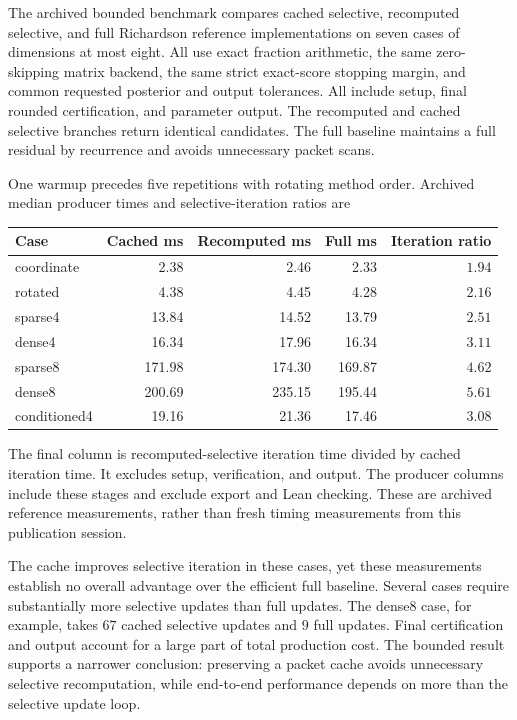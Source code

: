The archived bounded benchmark compares cached selective, recomputed selective,
and full Richardson reference implementations on seven cases of dimensions at
most eight. All use exact fraction arithmetic, the same zero-skipping matrix
backend, the same strict exact-score stopping margin, and common requested
posterior and output tolerances. All include setup, final rounded certification,
and parameter output. The recomputed and cached selective branches return
identical candidates. The full baseline maintains a full residual by recurrence
and avoids unnecessary packet scans.

One warmup precedes five repetitions with rotating method order. Archived median
producer times and selective-iteration ratios are
\begin{center}
\begin{tabular}{lrrrr}
\toprule
Case & Cached ms & Recomputed ms & Full ms & Iteration ratio\\
\midrule
coordinate & 2.38 & 2.46 & 2.33 & $1.94$\\
rotated & 4.38 & 4.45 & 4.28 & $2.16$\\
sparse4 & 13.84 & 14.52 & 13.79 & $2.51$\\
dense4 & 16.34 & 17.96 & 16.34 & $3.11$\\
sparse8 & 171.98 & 174.30 & 169.87 & $4.62$\\
dense8 & 200.69 & 235.15 & 195.44 & $5.61$\\
conditioned4 & 19.16 & 21.36 & 17.46 & $3.08$\\
\bottomrule
\end{tabular}
\end{center}
The final column is recomputed-selective iteration time divided by cached
iteration time. It excludes setup, verification, and output. The producer columns
include these stages and exclude export and Lean checking. These are archived
reference measurements, rather than fresh timing measurements from this
publication session.

The cache improves selective iteration in these cases, yet these measurements
establish no overall advantage over the efficient full baseline. Several cases
require substantially more selective updates than full updates. The dense8 case,
for example, takes $67$ cached selective updates and $9$ full updates. Final
certification and output account for a large part of total production cost. The
bounded result supports a narrower conclusion: preserving a packet cache avoids
unnecessary selective recomputation, while end-to-end performance depends on more
than the selective update loop.

